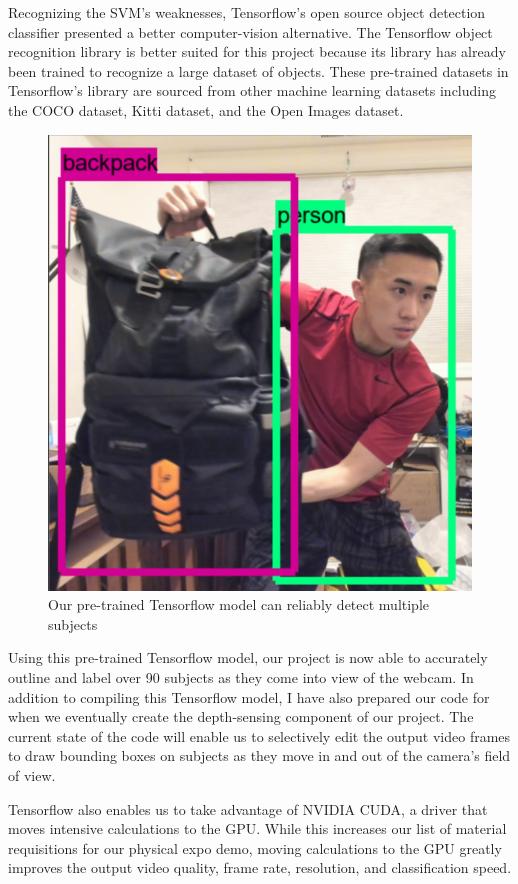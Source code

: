 \documentclass[onecolumn, draftclsnofoot,10pt, compsoc]{IEEEtran}
\makeatletter
\newcommand\captionof[1]{\def\@captype{#1}\caption}
\makeatother
\begin{document}
\begin{singlespace}
			Recognizing the SVM's weaknesses, Tensorflow's open source object detection classifier presented a better computer-vision alternative. \cite{tensorflow}
			The Tensorflow object recognition library is better suited for this project because its library has already been trained to recognize a large dataset of objects. \cite{convolutional_object_detectors}
			These pre-trained datasets in Tensorflow's library are sourced from other machine learning datasets including the COCO dataset, Kitti dataset, and the Open Images dataset. \cite{coco} \cite{open_images} \cite{kitti}


			\begin{figure}[H]
			\includegraphics[scale=0.5]{tensorflow.PNG}
			\captionof{figure}{Our pre-trained Tensorflow model can reliably detect multiple subjects}
			\label{tf-detect}
			\end{figure}


			Using this pre-trained Tensorflow model, our project is now able to accurately outline and label over 90 subjects as they come into view of the webcam.
			In addition to compiling this Tensorflow model, I have also prepared our code for when we eventually create the depth-sensing component of our project.
			The current state of the code will enable us to selectively edit the output video frames to draw bounding boxes on subjects as they move in and out of the camera's field of view.


			Tensorflow also enables us to take advantage of NVIDIA CUDA, a driver that moves intensive calculations to the GPU.
			While this increases our list of material requisitions for our physical expo demo, moving calculations to the GPU greatly improves the output video quality, frame rate, resolution, and classification speed. \cite{nvidia}
			

	\clearpage

\end{singlespace}
\end{document}
